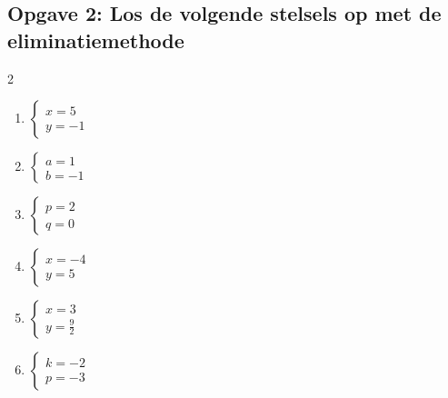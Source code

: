 \subsection*{Opgave 2: Los de volgende stelsels op met de eliminatiemethode}
\begin{multicols}{2}
\begin{enumerate}[label=\alph*)]
    \item $\begin{cases} x = 5 \\ y = -1 \end{cases}$
    \item $\begin{cases} a = 1 \\ b = -1 \end{cases}$
    \item $\begin{cases} p = 2 \\ q = 0 \end{cases}$
    \item $\begin{cases} x = -4 \\ y = 5 \end{cases}$
    \item $\begin{cases} x = 3 \\ y = \frac{9}{2} \end{cases}$
    \item $\begin{cases} k = -2 \\ p = -3 \end{cases}$
\end{enumerate}
\end{multicols}

